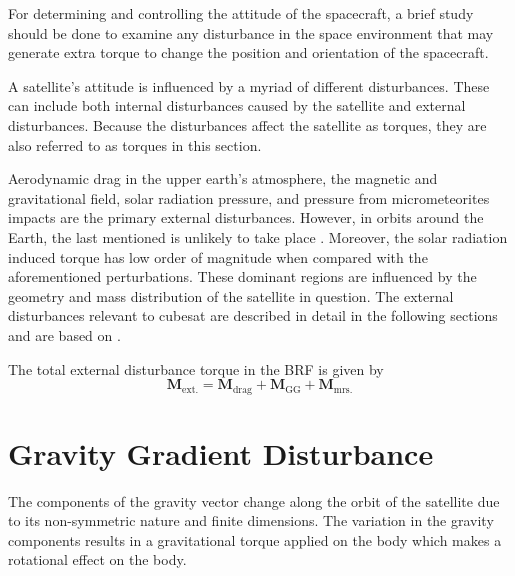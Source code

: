 For determining and controlling the attitude of the spacecraft, a brief study should be done to examine any disturbance in the space environment that may generate extra torque to change the position and orientation of the spacecraft.

A satellite's attitude is influenced by a myriad of different disturbances. These can include both internal disturbances caused by the satellite and external disturbances. Because the disturbances affect the satellite as torques, they are also referred to as torques in this section. 

Aerodynamic drag in the upper earth's atmosphere, the magnetic and gravitational field, solar radiation pressure, and pressure from micrometeorites impacts are the primary external disturbances. However, in orbits around the Earth, the last mentioned is unlikely to take place \cite{wertz2012spacecraft}. Moreover, the solar radiation induced torque has low order of magnitude when compared with the aforementioned perturbations. These dominant regions are influenced by the geometry and mass distribution of the satellite in question. The external disturbances relevant to cubesat are described in detail in the following sections and are based on \cite{wertz2012spacecraft, wie1998space}.

The total external disturbance torque in the BRF is given by
\begin{equation}
    \mathbf{M}_{\text{ext.}} = \mathbf{M}_{\text{drag}} + \mathbf{M}_{\text{GG}} + \mathbf{M}_{\text{mrs.}} 
\end{equation}


\section{Gravity Gradient Disturbance}
The components of the gravity vector change along the orbit of the satellite due to its non-symmetric nature and finite dimensions. The variation in the gravity components results in a gravitational torque applied on the body which makes a rotational effect on the body.

